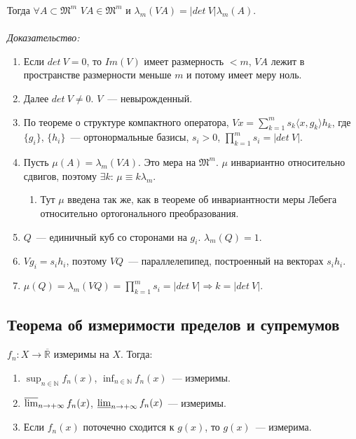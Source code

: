 \documentclass[paper=a4, fontsize=11pt]{article}
\begin{document}
Тогда $\forall A \subset \mathfrak{M}^m$ $VA \in \mathfrak{M}^m$ и $\lambda_m(VA) = |det\ V| \lambda_m(A)$.
\\\\
\emph{Доказательство:}
\begin{enumerate}
    \item Если $det\ V=0$, то $Im(V)$ имеет размерность $<m$, $VA$ лежит в пространстве размерности меньше $m$ и потому имеет меру ноль.
    \item Далее $det\ V \neq 0$. $V$~--- невырожденный.
    \item По теореме о структуре компактного оператора, $Vx = \sum_{k=1}^m s_k \langle x,g_k \rangle h_k$,
    где $\{g_i\}$, $\{h_i\}$~--- ортонормальные базисы, $s_i > 0$, $\prod_{k=1}^m s_i = |det\ V|$.
    \item Пусть $\mu(A) = \lambda_m(VA)$. Это мера на $\mathfrak{M}^m$. $\mu$ инвариантно относительно сдвигов, поэтому
    $\exists k$: $\mu \equiv k \lambda_m$.
    \begin{enumerate}
        \item Тут $\mu$ введена так же, как в теореме об инвариантности меры Лебега относительно ортогонального преобразования.
    \end{enumerate}
    \item $Q$~--- единичный куб со сторонами на $g_i$. $\lambda_m(Q) = 1$.
    \item $Vg_i = s_ih_i$, поэтому $VQ$~--- параллелепипед, построенный на векторах $s_ih_i$.
    \item $\mu(Q) = \lambda_m(VQ) = \prod_{k=1}^m s_i = |det\ V| \Rightarrow k=|det\ V|$.
\end{enumerate}

\subsection{Теорема об измеримости пределов и супремумов}
$f_n: X \rightarrow \overline{\mathds{R}}$ измеримы на $X$. Тогда:
\begin{enumerate}
    \item $\sup_{n \in \mathds{N}} f_n(x)$, $\inf_{n \in \mathds{N}} f_n(x)$~--- измеримы.
    \item $\varlimsup_{n \to +\infty} f_n(x)$, $\varliminf_{n \to +\infty} f_n(x)$~--- измеримы.
    \item Если $f_n(x)$ поточечно сходится к $g(x)$, то $g(x)$~--- измерима.
\end{enumerate}
\end{document}
